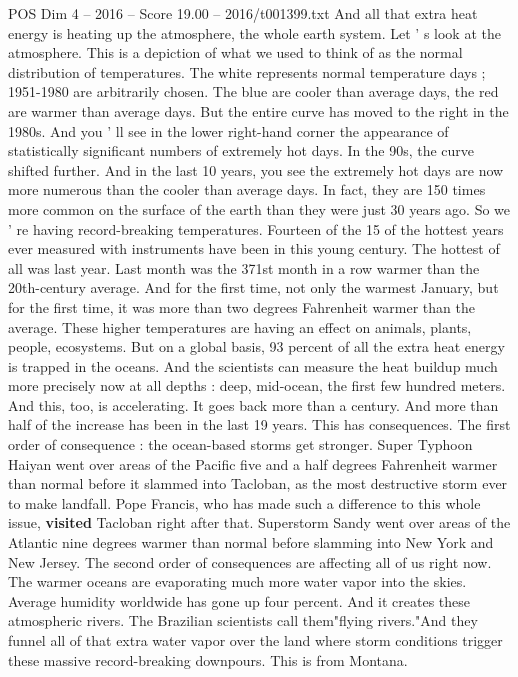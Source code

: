 \begin{textsample}{POS Dim 4 – 2016 – Score 19.00 – 2016/t001399.txt}
And all that extra heat energy is heating up the atmosphere, the whole earth system.
Let ' s look at the atmosphere.
This is a depiction of what we used to think of as the normal distribution of temperatures.
The white represents normal temperature days ; 1951-1980 are arbitrarily chosen.
The blue are cooler than average days, the red are warmer than average days.
But the entire curve has moved to the right in the 1980s.
And you ' ll see in the lower right-hand corner the appearance of statistically significant numbers of extremely hot days.
In the 90s, the curve shifted further.
And in the last 10 years, you see the extremely hot days are now more numerous than the cooler than average days.
In fact, they are 150 times more common on the surface of the earth than they were just 30 years ago.
So we ' re having record-breaking temperatures.
Fourteen of the 15 of the hottest years ever measured with instruments have been in this young century.
The hottest of all was last year.
Last month was the 371st month in a row warmer than the 20th-century average.
And for the first time, not only the warmest January, but for the first time, it was more than two degrees Fahrenheit warmer than the average.
These higher temperatures are having an effect on animals, plants, people, ecosystems.
But on a global basis, 93 percent of all the extra heat energy is trapped in the oceans.
And the scientists can measure the heat buildup much more precisely now at all depths : deep, mid-ocean, the first few hundred meters.
And this, too, is accelerating.
It goes back more than a century.
And more than half of the increase has been in the last 19 years.
This has consequences.
The first order of consequence : the ocean-based storms get stronger.
Super Typhoon Haiyan went over areas of the Pacific five and a half degrees Fahrenheit warmer than normal before it slammed into Tacloban, as the most destructive storm ever to make landfall.
Pope Francis, who has made such a difference to this whole issue, \textbf{visited} Tacloban right after that.
Superstorm Sandy went over areas of the Atlantic nine degrees warmer than normal before slamming into New York and New Jersey.
The second order of consequences are affecting all of us right now.
The warmer oceans are evaporating much more water vapor into the skies.
Average humidity worldwide has gone up four percent.
And it creates these atmospheric rivers.
The Brazilian scientists call them"flying rivers."And they funnel all of that extra water vapor over the land where storm conditions trigger these massive record-breaking downpours.
This is from Montana.

\end{textsample}
